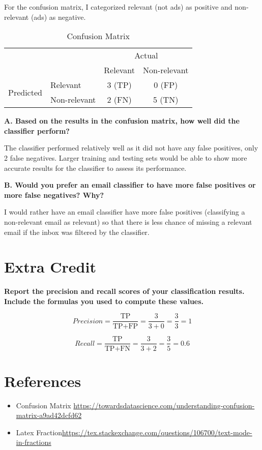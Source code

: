\documentclass[12pt]{article}
\begin{document}
For the confusion matrix, I categorized relevant (not ads) as positive and non-relevant (ads) as negative.

\begin{table}[h]
\centering
\caption{Confusion Matrix}
\label{tbl:confusion}
\begin{tabular}{l|l|c|c|}
\multicolumn{2}{c}{}&\multicolumn{2}{c}{Actual}\\
\cline{3-4}
\multicolumn{2}{c|}{}&Relevant&Non-relevant\\
\cline{2-4}
\multirow{2}{*}{Predicted}& Relevant & 3 (TP) & 0 (FP)\\
\cline{2-4}
& Non-relevant & 2 (FN) & 5 (TN) \\
\cline{2-4}
\end{tabular}
\end{table}

\noindent \textbf{A. Based on the results in the confusion matrix, how well did the classifier perform?}

The classifier performed relatively well as it did not have any false positives, only 2 false negatives. Larger training and testing sets would be able to show more accurate results for the classifier to assess its performance.

\noindent \textbf{B. Would you prefer an email classifier to have more false positives or more false negatives? Why?}

I would rather have an email classifier have more false positives (classifying a non-relevant email as relevant) so that there is less chance of missing a relevant email if the inbox was filtered by the classifier. 

\section*{Extra Credit}
\noindent \textbf{Report the precision and recall scores of your classification results. Include the formulas you used to compute these values.}

\[
Precision = \frac{\text{TP}}{\text{TP+FP}} = \frac{3}{3 + 0} = \frac{3}{3} = 1
\]

\[
Recall = \frac{\text{TP}}{\text{TP+FN}} = \frac{3}{3 + 2} = \frac{3}{5} = 0.6
\]

\section*{References}

\begin{itemize}
    \item{Confusion Matrix} \url{https://towardsdatascience.com/understanding-confusion-matrix-a9ad42dcfd62}
    \item{Latex Fraction}\url{https://tex.stackexchange.com/questions/106700/text-mode-in-fractions}
\end{itemize}
\end{document}
